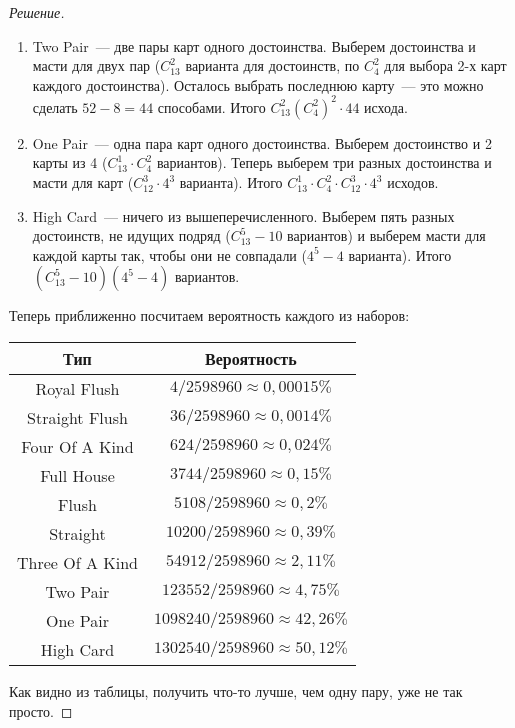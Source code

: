 \documentclass[a4paper,12pt]{article}
\begin{document}
\begin{proof}[Решение]
\begin{enumerate}
		\item Two Pair~--- две пары карт одного достоинства. Выберем достоинства и масти для двух пар (\(C_{13}^{2}\) варианта для достоинств, по \(C_{4}^{2}\) для выбора 2-х карт каждого достоинства). Осталось выбрать последнюю карту~--- это можно сделать \(52 - 8 = 44\) способами. Итого \(C_{13}^{2} \left(C_{4}^{2}\right)^2 \cdot 44\) исхода.
		\item One Pair~--- одна пара карт одного достоинства. Выберем достоинство и 2 карты из 4 (\(C_{13}^{1} \cdot C_{4}^{2}\) вариантов). Теперь выберем три разных достоинства и масти для карт (\(C_{12}^{3} \cdot 4^3\) варианта). Итого \(C_{13}^{1} \cdot C_{4}^{2} \cdot C_{12}^{3} \cdot 4^3\) исходов.
		\item High Card~--- ничего из вышеперечисленного. Выберем пять разных достоинств, не идущих подряд (\(C_{13}^{5} - 10\) вариантов) и выберем масти для каждой карты так, чтобы они не совпадали (\(4^5 - 4\) варианта). Итого \((C_{13}^{5} - 10)(4^5 - 4)\) вариантов.
	\end{enumerate}
	Теперь приближенно посчитаем вероятность каждого из наборов:
	
	\begin{center}
		\begin{tabular}{|c|c|}
			\hline
			Тип & Вероятность \\
			\hline
			Royal Flush & \(4/2598960 \approx 0,00015\%\) \\
			\hline
			Straight Flush & \(36/2598960 \approx 0,0014\%\) \\
			\hline
			Four Of A Kind & \(624/2598960 \approx 0,024\%\) \\
			\hline
			Full House & \(3744/2598960 \approx 0,15\%\) \\
			\hline
			Flush & \(5108/2598960 \approx 0,2\%\) \\
			\hline
			Straight & \(10200/2598960 \approx 0,39\%\) \\
			\hline
			Three Of A Kind & \(54912/2598960 \approx 2,11\%\) \\
			\hline
			Two Pair & \(123552/2598960 \approx 4,75\%\) \\
			\hline
			One Pair & \(1098240/2598960 \approx 42,26\%\) \\
			\hline
			High Card & \(1302540/2598960 \approx 50,12\%\) \\
			\hline
		\end{tabular}
	\end{center}
	Как видно из таблицы, получить что-то лучше, чем одну пару, уже не так просто.
\end{proof}
\end{document}
